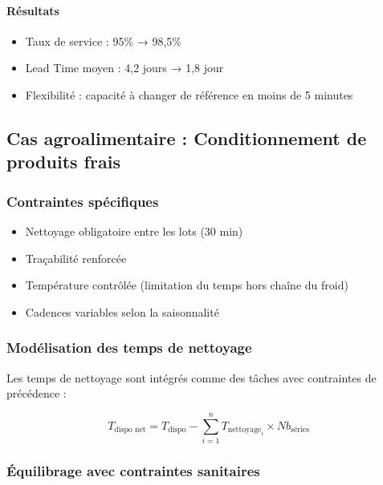 \documentclass[12pt,a4paper]{article}
\begin{document}
\begin{center}
\paragraph{Résultats}
\begin{itemize}
    \item Taux de service : 95\% → 98,5\%
    \item Lead Time moyen : 4,2 jours → 1,8 jour
    \item Flexibilité : capacité à changer de référence en moins de 5 minutes
\end{itemize}

\subsection{Cas agroalimentaire : Conditionnement de produits frais}

\subsubsection{Contraintes spécifiques}
\begin{itemize}
    \item Nettoyage obligatoire entre les lots (30 min)
    \item Traçabilité renforcée
    \item Température contrôlée (limitation du temps hors chaîne du froid)
    \item Cadences variables selon la saisonnalité
\end{itemize}

\subsubsection{Modélisation des temps de nettoyage}

Les temps de nettoyage sont intégrés comme des tâches avec contraintes de précédence :

\[
T_{\text{dispo net}} = T_{\text{dispo}} - \sum_{i=1}^{n} T_{\text{nettoyage}_i} \times Nb_{\text{séries}}
\]

\subsubsection{Équilibrage avec contraintes sanitaires}

\begin{figure}[H]
\centering
{}
\end{figure}
\end{center}
\end{document}
